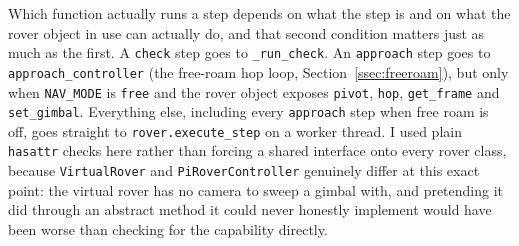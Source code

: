 Which function actually runs a step depends on what the step is and on
what the rover object in use can actually do, and that second condition
matters just as much as the first. A \texttt{check} step goes to
\texttt{\_run\_check}. An \texttt{approach} step goes to
\texttt{approach\_controller} (the free-roam hop loop,
Section~\ref{ssec:freeroam}), but only when \texttt{NAV\_MODE} is
\texttt{free} and the rover object exposes \texttt{pivot}, \texttt{hop},
\texttt{get\_frame} and \texttt{set\_gimbal}. Everything else, including
every \texttt{approach} step when free roam is off, goes straight to
\texttt{rover.execute\_step} on a worker thread. I used plain
\texttt{hasattr} checks here rather than forcing a shared interface onto
every rover class, because \texttt{VirtualRover} and
\texttt{PiRoverController} genuinely differ at this exact point: the
virtual rover has no camera to sweep a gimbal with, and pretending it did
through an abstract method it could never honestly implement would have
been worse than checking for the capability directly.

